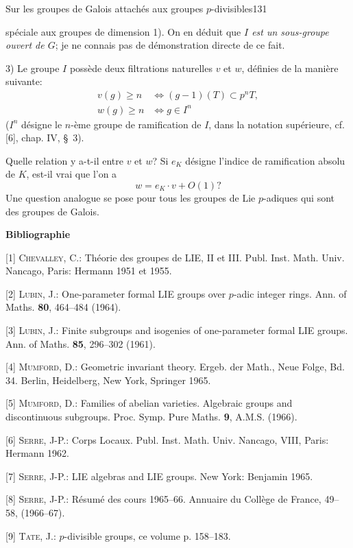Sur les groupes de Galois attachés aux groupes $p$-divisibles\hfill 131

spéciale aux groupes de dimension 1). On en déduit que \textit{$I$ est un sous-groupe ouvert de $G$}; je ne connais pas de démonstration directe de ce fait.

3) Le groupe $I$ possède deux filtrations naturelles $v$ et $w$, définies de la manière suivante:
\[
\begin{aligned}
v(g)\geq n&\Leftrightarrow(g-1)(T)\subset p^nT,\\
w(g)\geq n&\Leftrightarrow g\in I^n
\end{aligned}
\]
($I^n$ désigne le $n$-ème groupe de ramification de $I$, dans la notation supérieure, cf. [6], chap. IV, \S\ 3).

Quelle relation y a-t-il entre $v$ et $w$? Si $e_K$ désigne l'indice de ramification absolu de $K$, est-il vrai que l'on a
\[
w=e_K\cdot v+O(1)?
\]
Une question analogue se pose pour tous les groupes de Lie $p$-adiques qui sont des groupes de Galois.

\begin{center}\textbf{Bibliographie}\end{center}

[1] \textsc{Chevalley}, C.: Théorie des groupes de LIE, II et III. Publ. Inst. Math. Univ. Nancago, Paris: Hermann 1951 et 1955.

[2] \textsc{Lubin}, J.: One-parameter formal LIE groups over $p$-adic integer rings. Ann. of Maths. \textbf{80}, 464--484 (1964).

[3] \textsc{Lubin}, J.: Finite subgroups and isogenies of one-parameter formal LIE groups. Ann. of Maths. \textbf{85}, 296--302 (1961).

[4] \textsc{Mumford}, D.: Geometric invariant theory. Ergeb. der Math., Neue Folge, Bd. 34. Berlin, Heidelberg, New York, Springer 1965.

[5] \textsc{Mumford}, D.: Families of abelian varieties. Algebraic groups and discontinuous subgroups. Proc. Symp. Pure Maths. \textbf{9}, A.M.S. (1966).

[6] \textsc{Serre}, J-P.: Corps Locaux. Publ. Inst. Math. Univ. Nancago, VIII, Paris: Hermann 1962.

[7] \textsc{Serre}, J-P.: LIE algebras and LIE groups. New York: Benjamin 1965.

[8] \textsc{Serre}, J-P.: Résumé des cours 1965--66. Annuaire du Collège de France, 49--58, (1966--67).

[9] \textsc{Tate}, J.: $p$-divisible groups, ce volume p. 158--183.

